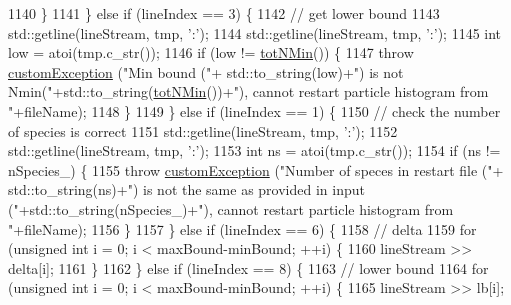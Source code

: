 \begin{DoxyCode}
1140                 \}
1141             \} \textcolor{keywordflow}{else} \textcolor{keywordflow}{if} (lineIndex == 3) \{
1142                 \textcolor{comment}{// get lower bound}
1143                 std::getline(lineStream, tmp, \textcolor{charliteral}{':'});
1144                 std::getline(lineStream, tmp, \textcolor{charliteral}{':'});
1145                 \textcolor{keywordtype}{int} low = atoi(tmp.c\_str());
1146                 \textcolor{keywordflow}{if} (low != \hyperlink{classsim_system_af10842e0eaa638373b8717c87b47e6bc}{totNMin}()) \{
1147                     \textcolor{keywordflow}{throw} \hyperlink{classcustom_exception}{customException} (\textcolor{stringliteral}{"Min bound ("}+ std::to\_string(low)+\textcolor{stringliteral}{") is not
       Nmin("}+std::to\_string(\hyperlink{classsim_system_af10842e0eaa638373b8717c87b47e6bc}{totNMin}())+\textcolor{stringliteral}{"), cannot restart particle histogram from "}+fileName);
1148                 \}
1149             \} \textcolor{keywordflow}{else} \textcolor{keywordflow}{if} (lineIndex == 1) \{
1150                 \textcolor{comment}{// check the number of species is correct}
1151                 std::getline(lineStream, tmp, \textcolor{charliteral}{':'});
1152                 std::getline(lineStream, tmp, \textcolor{charliteral}{':'});
1153                 \textcolor{keywordtype}{int} ns = atoi(tmp.c\_str());
1154                 \textcolor{keywordflow}{if} (ns != nSpecies\_) \{
1155                     \textcolor{keywordflow}{throw} \hyperlink{classcustom_exception}{customException} (\textcolor{stringliteral}{"Number of speces in restart file ("}+ 
      std::to\_string(ns)+\textcolor{stringliteral}{") is not the same as provided in input ("}+std::to\_string(nSpecies\_)+\textcolor{stringliteral}{"), cannot restart particle
       histogram from "}+fileName);
1156                 \}
1157             \} \textcolor{keywordflow}{else} \textcolor{keywordflow}{if} (lineIndex == 6) \{
1158                 \textcolor{comment}{// delta}
1159                 \textcolor{keywordflow}{for} (\textcolor{keywordtype}{unsigned} \textcolor{keywordtype}{int} i = 0; i < maxBound-minBound; ++i) \{
1160                     lineStream >> delta[i];
1161                 \}
1162             \} \textcolor{keywordflow}{else} \textcolor{keywordflow}{if} (lineIndex == 8) \{
1163                 \textcolor{comment}{// lower bound}
1164                 \textcolor{keywordflow}{for} (\textcolor{keywordtype}{unsigned} \textcolor{keywordtype}{int} i = 0; i < maxBound-minBound; ++i) \{
1165                     lineStream >> lb[i];

\end{DoxyCode}
